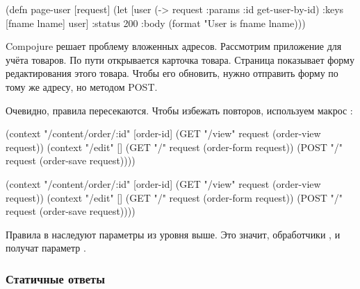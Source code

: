 \begin{clojure}
(defn page-user [request]
   (let [user (-> request
                  :params
                  :id
                  get-user-by-id)
         {:keys [fname lname]} user]
     {:status 200
      :body (format "User is %
                    fname lname)}))
\end{clojure}

\else


\fi

Compojure решает проблему вложенных адресов. Рассмотрим приложение для учёта
товаров. По пути  открывается карточка
товара. Страница  показывает форму
редактирования этого товара. Чтобы его обновить, нужно отправить форму по тому
же адресу, но методом POST.

Очевидно, правила пересекаются. Чтобы избежать повторов, используем макрос
:


\ifnarrow

\begin{clojure}
(context "/content/order/:id" [order-id]
  (GET  "/view" request
        (order-view request))
  (context "/edit" []
    (GET  "/" request
          (order-form request))
    (POST "/" request
          (order-save request))))
\end{clojure}

\else

\begin{clojure}
(context "/content/order/:id" [order-id]
  (GET  "/view" request (order-view request))
  (context "/edit" []
    (GET  "/" request (order-form request))
    (POST "/" request (order-save request))))
\end{clojure}

\fi

Правила в  наследуют параметры из уровня выше. Это значит,
обработчики ,  и 
получат параметр .

\subsubsection*{Статичные ответы}

